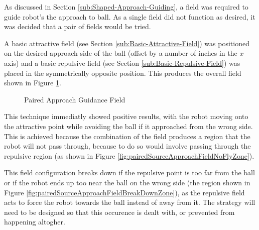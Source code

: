 \documentclass[10pt]{article}
\begin{document}
As discussed in Section \ref{sub:Shaped-Approach-Guiding}, a field was required
to guide robot's the approach to ball. As a single field did not function as
desired, it was decided that a pair of fields would be tried.

A basic attractive field (see Section \ref{sub:Basic-Attractive-Field}) was
positioned on the desired approach side of the ball (offset by a number of
inches in the $x$ axis) and a basic repulsive field (see Section
\ref{sub:Basic-Repulsive-Field}) was placed in the symmetrically opposite
position. This produces the overall field shown in Figure
\ref{fig:pairedApproachField}.

\begin{figure}
 \centering
 \caption{Paired Approach Guidance Field}
 \label{fig:pairedApproachField}
\end{figure}

This technique immediatly showed positive results, with the robot moving onto
the attractive point while avoiding the ball if it approached from the wrong
side. This is achieved because the combination of the field produces a region
that the robot will not pass through, because to do so would involve passing
through the repulsive region (as shown in Figure
\ref{fig:pairedSourceApproachFieldNoFlyZone}).  

This field configuration breaks down if the repulsive point is too far from the
ball or if the robot ends up too near the ball on the wrong side (the region
shown in Figure \ref{fig:pairedSourceApproachFieldBreakDownZone}), as the
repulsive field acts to force the robot towards the ball instead of away from
it.  The strategy will need to be designed so that this occurence is dealt with,
or prevented from happening altogher.
\end{document}
